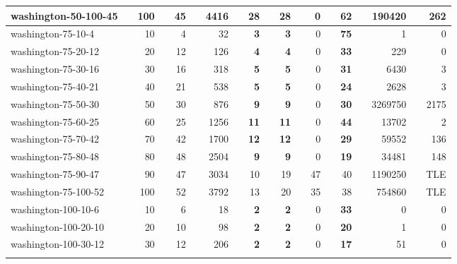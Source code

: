 \begin{table}[!ht]
{\begin{tabular}{llrlrlrlrlrlrlrlrlr}
\rowcolor[HTML]{9B9B9B} 
washington-50-100-45 &  & 100 &  & 45 &  & 4416 &  & \textbf{28} &  & \textbf{28} &  & 0 &  & \textbf{62} &  & 190420 &  & 262 \\ \hline
\rowcolor[HTML]{9B9B9B} 
washington-75-10-4 &  & 10 &  & 4 &  & 32 &  & \textbf{3} &  & \textbf{3} &  & 0 &  & \textbf{75} &  & 1 &  & 0 \\
\rowcolor[HTML]{9B9B9B} 
washington-75-20-12 &  & 20 &  & 12 &  & 126 &  & \textbf{4} &  & \textbf{4} &  & 0 &  & \textbf{33} &  & 229 &  & 0 \\
\rowcolor[HTML]{9B9B9B} 
washington-75-30-16 &  & 30 &  & 16 &  & 318 &  & \textbf{5} &  & \textbf{5} &  & 0 &  & \textbf{31} &  & 6430 &  & 3 \\
\rowcolor[HTML]{9B9B9B} 
washington-75-40-21 &  & 40 &  & 21 &  & 538 &  & \textbf{5} &  & \textbf{5} &  & 0 &  & \textbf{24} &  & 2628 &  & 3 \\
\rowcolor[HTML]{9B9B9B} 
washington-75-50-30 &  & 50 &  & 30 &  & 876 &  & \textbf{9} &  & \textbf{9} &  & 0 &  & \textbf{30} &  & 3269750 &  & 2175 \\
\rowcolor[HTML]{9B9B9B} 
washington-75-60-25 &  & 60 &  & 25 &  & 1256 &  & \textbf{11} &  & \textbf{11} &  & 0 &  & \textbf{44} &  & 13702 &  & 2 \\
\rowcolor[HTML]{9B9B9B} 
washington-75-70-42 &  & 70 &  & 42 &  & 1700 &  & \textbf{12} &  & \textbf{12} &  & 0 &  & \textbf{29} &  & 59552 &  & 136 \\
\rowcolor[HTML]{9B9B9B} 
washington-75-80-48 &  & 80 &  & 48 &  & 2504 &  & \textbf{9} &  & \textbf{9} &  & 0 &  & \textbf{19} &  & 34481 &  & 148 \\
\rowcolor[HTML]{C0C0C0} 
washington-75-90-47 &  & 90 &  & 47 &  & 3034 &  & 10 &  & 19 &  & 47 &  & 40 &  & 1190250 &  & TLE \\
\rowcolor[HTML]{C0C0C0} 
washington-75-100-52 &  & 100 &  & 52 &  & 3792 &  & 13 &  & 20 &  & 35 &  & 38 &  & 754860 &  & TLE \\ \hline
\rowcolor[HTML]{9B9B9B} 
washington-100-10-6 &  & 10 &  & 6 &  & 18 &  & \textbf{2} &  & \textbf{2} &  & 0 &  & \textbf{33} &  & 0 &  & 0 \\
\rowcolor[HTML]{9B9B9B} 
washington-100-20-10 &  & 20 &  & 10 &  & 98 &  & \textbf{2} &  & \textbf{2} &  & 0 &  & \textbf{20} &  & 1 &  & 0 \\
\rowcolor[HTML]{9B9B9B} 
washington-100-30-12 &  & 30 &  & 12 &  & 206 &  & \textbf{2} &  & \textbf{2} &  & 0 &  & \textbf{17} &  & 51 &  & 0 \\
\rowcolor[HTML]{9B9B9B} 

\end{tabular}}
\end{table}
